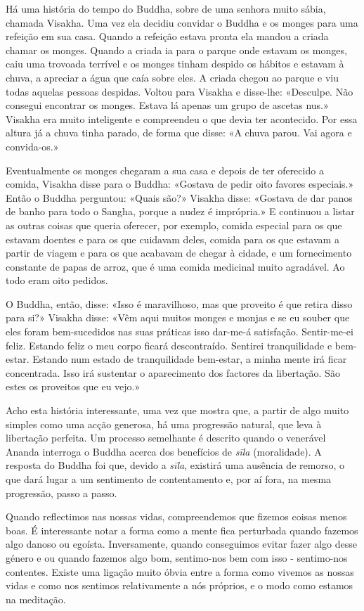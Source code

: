 Há uma história do tempo do Buddha, sobre de uma senhora muito sábia,
chamada Visakha. Uma vez ela decidiu convidar o Buddha e os monges para
uma refeição em sua casa. Quando a refeição estava pronta ela mandou a
criada chamar os monges. Quando a criada ia para o parque onde estavam
os monges, caiu uma trovoada terrível e os monges tinham despido os
hábitos e estavam à chuva, a apreciar a água que caía sobre eles. A
criada chegou ao parque e viu todas aquelas pessoas despidas. Voltou
para Visakha e disse-lhe: «Desculpe. Não consegui encontrar os monges.
Estava lá apenas um grupo de ascetas nus.» Visakha era muito inteligente
e compreendeu o que devia ter acontecido. Por essa altura já a chuva
tinha parado, de forma que disse: «A chuva parou. Vai agora e
convida-os.»

Eventualmente os monges chegaram a sua casa e depois de ter oferecido a
comida, Visakha disse para o Buddha: «Gostava de pedir oito favores
especiais.» Então o Buddha perguntou: «Quais são?» Visakha disse:
«Gostava de dar panos de banho para todo o Sangha, porque a nudez é
imprópria.» E continuou a listar as outras coisas que queria oferecer,
por exemplo, comida especial para os que estavam doentes e para os que
cuidavam deles, comida para os que estavam a partir de viagem e para os
que acabavam de chegar à cidade, e um fornecimento constante de papas de
arroz, que é uma comida medicinal muito agradável. Ao todo eram oito
pedidos.

O Buddha, então, disse: «Isso é maravilhoso, mas que proveito é que
retira disso para si?» Visakha disse: «Vêm aqui muitos monges e monjas e
se eu souber que eles foram bem-sucedidos nas suas práticas isso
dar-me-á satisfação. Sentir-me-ei feliz. Estando feliz o meu corpo
ficará descontraído. Sentirei tranquilidade e bem-estar. Estando num
estado de tranquilidade \mbox{bem-estar}, a minha mente irá ficar concentrada.
Isso irá sustentar o aparecimento dos factores da libertação. São estes
os proveitos que eu vejo.»

Acho esta história interessante, uma vez que mostra que, a partir de
algo muito simples como uma acção generosa, há uma progressão natural,
que leva à libertação perfeita. Um processo semelhante é descrito quando
o venerável Ananda interroga o Buddha acerca dos benefícios de
\emph{sīla} (moralidade). A resposta do Buddha foi que, devido a
\emph{sīla}, existirá uma ausência de remorso, o que dará lugar a um
sentimento de contentamento e, por aí fora, na mesma progressão, passo a
passo.

Quando reflectimos nas nossas vidas, compreendemos que fizemos coisas
menos boas. É interessante notar a forma como a mente fica perturbada
quando fazemos algo danoso ou egoísta. Inversamente, quando conseguimos
evitar fazer algo desse género e ou quando fazemos algo bom, sentimo-nos
bem com isso - sentimo-nos contentes. Existe uma ligação muito óbvia
entre a forma como vivemos as nossas vidas e como nos sentimos
relativamente a nós próprios, e o modo como estamos na meditação.

